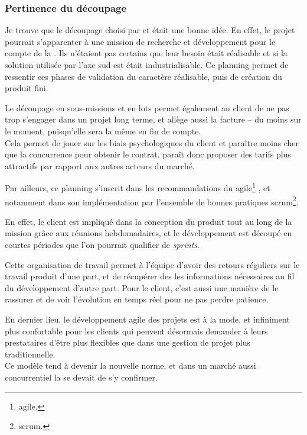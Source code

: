 \subsubsection{Pertinence du découpage}

Je trouve que le découpage choisi par \gil et \damien était une bonne idée. En effet, le projet pourrait s'apparenter à une mission de recherche et développement pour le compte de la \sncf. Ils n'étaient pas certains que leur besoin était réalisable et si la solution utilisée par l'axe sud-est était industrialisable. Ce planning permet de ressentir ces phases de validation du caractère réalisable, puis de création du produit fini.

Le découpage en sous-missions et en lots permet également au client de ne pas trop s'engager dans un projet long terme, et allège aussi la facture -- du moins sur le moment, puisqu'elle sera la même en fin de compte.\\
Cela permet de jouer sur les biais psychologiques du client et paraître moins cher que la concurrence pour obtenir le contrat. \tnp paraît donc proposer des tarifs plus attractifs par rapport aux autres acteurs du marché.

Par ailleurs, ce planning s'inscrit dans les recommandations du 
\gls{agile}\footnote{\glsdesc{agile}.}\cite{noauthor_4_nodate}\cite{noauthor_manifeste_nodate}
, et notamment dans son implémentation par l'ensemble de bonnes pratiques
\gls{scrum}\footnote{\glsdesc{scrum}.}\cite{noauthor_scrum_nodate}.

En effet, le client est impliqué dans la conception du produit tout au long de la mission grâce aux réunions hebdomadaires, et le développement est découpé en courtes périodes que l'on pourrait qualifier de \textit{sprints}.

Cette organisation de travail permet à l'équipe d'avoir des retours réguliers sur le travail produit d'une part, et de récupérer des les informations nécessaires au fil du développement d'autre part. Pour le client, c'est aussi une manière de le rassurer et de voir l'évolution en temps réel pour ne pas perdre patience.

En dernier lieu, le développement agile des projets est à la mode, et infiniment plus confortable pour les clients qui peuvent désormais demander à leurs prestataires d'être plus flexibles que dans une gestion de projet plus traditionnelle.\\
Ce modèle tend à devenir la nouvelle norme, et dans un marché aussi concurrentiel la \df se devait de s'y confirmer.

